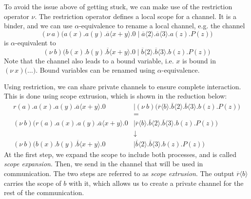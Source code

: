 \documentclass[a4paper, openany]{memoir}
\theoremstyle{definition}
\begin{document}
    To avoid the issue above of getting stuck, we can make use of the restriction operator $\nu$. The restriction operator defines a local scope for a channel. It is a binder, and we can use $\alpha$-equivalence to rename a local channel, e.g. the channel
    \[(\nu \ a)\textbf{(}a(x).a(y).\overline{a} \langle x + y \rangle.0 \mid \overline{a} \langle 2 \rangle.\overline{a} \langle 3 \rangle.a(z).P(z) \textbf{)}\]
    is $\alpha$-equivalent to
    \[(\nu \ b)\textbf{(}b(x).b(y).\overline{b} \langle x + y \rangle.0 \mid \overline{b} \langle 2 \rangle.\overline{b} \langle 3 \rangle.b(z).P(z) \textbf{)}\]
    Note that the channel also leads to a bound variable, i.e. $x$ is bound in $(\nu \ x)\textbf{(}\dots\textbf{)}$. Bound variables can be renamed using $\alpha$-equivalence.

    Using restriction, we can share private channels to ensure complete interaction. This is done using scope extrusion, which is shown in the reduction below:
    \begin{align*}
        r(a).a(x).a(y).\overline{a} \langle x + y \rangle.0 &\mid (\nu \ b)\textbf{(}\overline{r}\langle b \rangle.\overline{b} \langle 2 \rangle.\overline{b} \langle 3 \rangle.b(z).P(z) \textbf{)} \\
        &= \\
        (\nu \ b)\textbf{(}r(a).a(x).a(y).\overline{a} \langle x + y \rangle.0 &\mid \overline{r}\langle b \rangle.\overline{b} \langle 2 \rangle.\overline{b} \langle 3 \rangle.b(z).P(z) \textbf{)} \\
        &\downarrow \\
        (\nu \ b)\textbf{(}b(x).b(y).\overline{b} \langle x + y \rangle.0 &\mid \overline{b} \langle 2 \rangle.\overline{b} \langle 3 \rangle.b(z).P(z) \textbf{)} 
    \end{align*}
    At the first step, we expand the scope to include both processes, and is called \emph{scope expansion}. Then, we send in the channel that will be used in communication. The two steps are referred to as \emph{scope extrusion}. The output $\overline{r} \langle b \rangle$ carries the scope of $b$ with it, which allows us to create a private channel for the rest of the communication.
    
\end{document}
